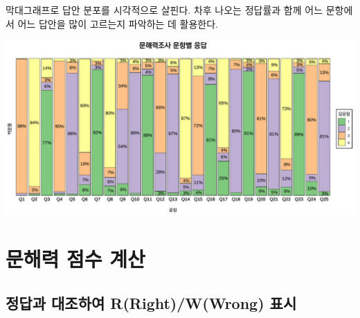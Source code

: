 \documentclass[
]{book}
\begin{document}
막대그래프로 답안 분포를 시각적으로 살핀다. 차후 나오는 정답률과 함께 어느 문항에서 어느 답안을 많이 고르는지 파악하는 데 활용한다.

\includegraphics{_main_files/figure-latex/unnamed-chunk-5-1.pdf}

\section{문해력 점수 계산}\label{uxbb38uxd574uxb825-uxc810uxc218-uxacc4uxc0b0}

\subsection{정답과 대조하여 R(Right)/W(Wrong) 표시}\label{uxc815uxb2f5uxacfc-uxb300uxc870uxd558uxc5ec-rrightwwrong-uxd45cuxc2dc}
\end{document}
